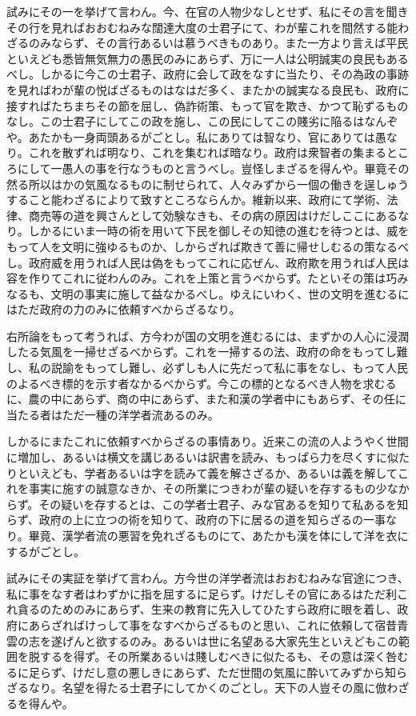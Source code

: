 \documentclass[a4paper, platex, dvipdfmx]{jsarticle}
\begin{document}
試みにその一を挙げて言わん。今、在官の人物少なしとせず、私にその言を聞きその行を見ればおおむねみな闊達大度の士君子にて、わが輩これを間然する能わざるのみならず、その言行あるいは慕うべきものあり。また一方より言えば平民といえども悉皆無気無力の愚民のみにあらず、万に一人は公明誠実の良民もあるべし。しかるに今この士君子、政府に会して政をなすに当たり、その為政の事跡を見ればわが輩の悦ばざるものはなはだ多く、またかの誠実なる良民も、政府に接すればたちまちその節を屈し、偽詐術策、もって官を欺き、かつて恥ずるものなし。この士君子にしてこの政を施し、この民にしてこの賤劣に陥るはなんぞや。あたかも一身両頭あるがごとし。私にありては智なり、官にありては愚なり。これを散ずれば明なり、これを集むれば暗なり。政府は衆智者の集まるところにして一愚人の事を行なうものと言うべし。豈怪しまざるを得んや。畢竟その然る所以はかの気風なるものに制せられて、人々みずから一個の働きを逞しゅうすること能わざるによりて致すところならんか。維新以来、政府にて学術、法律、商売等の道を興さんとして効験なきも、その病の原因はけだしここにあるなり。しかるにいま一時の術を用いて下民を御しその知徳の進むを待つとは、威をもって人を文明に強ゆるものか、しからざれば欺きて善に帰せしむるの策なるべし。政府威を用うれば人民は偽をもってこれに応ぜん、政府欺を用うれば人民は容を作りてこれに従わんのみ。これを上策と言うべからず。たといその策は巧みなるも、文明の事実に施して益なかるべし。ゆえにいわく、世の文明を進むるにはただ政府の力のみに依頼すべからざるなり。

右所論をもって考うれば、方今わが国の文明を進むるには、まずかの人心に浸潤したる気風を一掃せざるべからず。これを一掃するの法、政府の命をもってし難し、私の説諭をもってし難し、必ずしも人に先だって私に事をなし、もって人民のよるべき標的を示す者なかるべからず。今この標的となるべき人物を求むるに、農の中にあらず、商の中にあらず、また和漢の学者中にもあらず、その任に当たる者はただ一種の洋学者流あるのみ。

しかるにまたこれに依頼すべからざるの事情あり。近来この流の人ようやく世間に増加し、あるいは横文を講じあるいは訳書を読み、もっぱら力を尽くすに似たりといえども、学者あるいは字を読みて義を解さざるか、あるいは義を解してこれを事実に施すの誠意なきか、その所業につきわが輩の疑いを存するもの少なからず。その疑いを存するとは、この学者士君子、みな官あるを知りて私あるを知らず、政府の上に立つの術を知りて、政府の下に居るの道を知らざるの一事なり。畢竟、漢学者流の悪習を免れざるものにて、あたかも漢を体にして洋を衣にするがごとし。

試みにその実証を挙げて言わん。方今世の洋学者流はおおむねみな官途につき、私に事をなす者はわずかに指を屈するに足らず。けだしその官にあるはただ利これ貪るのためのみにあらず、生来の教育に先入してひたすら政府に眼を着し、政府にあらざればけっして事をなすべからざるものと思い、これに依頼して宿昔青雲の志を遂げんと欲するのみ。あるいは世に名望ある大家先生といえどもこの範囲を脱するを得ず。その所業あるいは賤しむべきに似たるも、その意は深く咎むるに足らず、けだし意の悪しきにあらず、ただ世間の気風に酔いてみずから知らざるなり。名望を得たる士君子にしてかくのごとし。天下の人豈その風に倣わざるを得んや。
\end{document}
